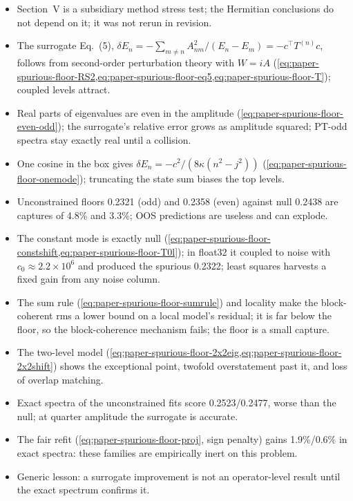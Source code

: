\begin{itemize}
\item Section~V is a subsidiary method stress test; the Hermitian conclusions do not depend on it; it was not rerun in revision.
\item The surrogate Eq.~(5), $\delta E_n=-\sum_{m\ne n}A_{nm}^2/(E_n-E_m)=-c^\top T^{(n)}c$, follows from second-order perturbation theory with $W=iA$ (\cref{eq:paper-spurious-floor-RS2,eq:paper-spurious-floor-eq5,eq:paper-spurious-floor-T}); coupled levels attract.
\item Real parts of eigenvalues are even in the amplitude (\cref{eq:paper-spurious-floor-even-odd}); the surrogate's relative error grows as amplitude squared; PT-odd spectra stay exactly real until a collision.
\item One cosine in the box gives $\delta E_n=-c^2/(8\kappa(n^2-j^2))$ (\cref{eq:paper-spurious-floor-onemode}); truncating the state sum biases the top levels.
\item Unconstrained floors 0.2321 (odd) and 0.2358 (even) against null 0.2438 are captures of 4.8\% and 3.3\%; OOS predictions are useless and can explode.
\item The constant mode is exactly null (\cref{eq:paper-spurious-floor-constshift,eq:paper-spurious-floor-T0l}); in float32 it coupled to noise with $c_0\approx2.2\times10^6$ and produced the spurious 0.2322; least squares harvests a fixed gain from any noise column.
\item The sum rule (\cref{eq:paper-spurious-floor-sumrule}) and locality make the block-coherent rms a lower bound on a local model's residual; it is far below the floor, so the block-coherence mechanism fails; the floor is a small capture.
\item The two-level model (\cref{eq:paper-spurious-floor-2x2eig,eq:paper-spurious-floor-2x2shift}) shows the exceptional point, twofold overstatement past it, and loss of overlap matching.
\item Exact spectra of the unconstrained fits score 0.2523/0.2477, worse than the null; at quarter amplitude the surrogate is accurate.
\item The fair refit (\cref{eq:paper-spurious-floor-proj}, sign penalty) gains 1.9\%/0.6\% in exact spectra: these families are empirically inert on this problem.
\item Generic lesson: a surrogate improvement is not an operator-level result until the exact spectrum confirms it.
\end{itemize}

